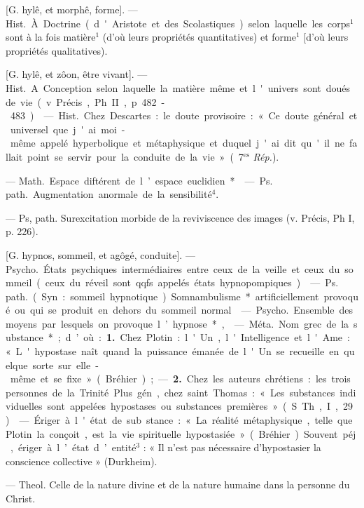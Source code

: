 \begin{itemize}[leftmargin=1cm, label=, itemsep=1pt]
 [G. hylê, et morphê,
forme]. — \si{Hist.} À. Doctrine (d'Aristote et des Scolastiques) selon laquelle les corps$^1$ sont à la fois matière$^1$ (d’où leurs propriétés quantitatives) et forme$^1$ [d’où leurs propriétés qualitatives).

 [G. hylê, et zôon, être
vivant]. — \si{Hist.} A. Conception
selon laquelle la matière même et
l'univers sont doués de vie (v. Précis,
Ph. II, p. 482-483).

 — \si{Hist.} Chez
Descartes : le doute provisoire : « Ce
doute général et universel que j'ai
moi-même appelé hyperbolique et
métaphysique et duquel j'ai dit
qu'il ne fallait point se servir pour...
la conduite de la vie » (7$^\text{es}$ {\it Rép.}).

 — \si{Math.} Espace diftérent de l’espace euclidien*.

 — \si{Ps. path.} Augmentation anormale de la sensibilité$^4$.

 — Ps, path. Surexcitation morbide de la reviviscence
des images (v. Précis, Ph I,
p. 226).

 [G. hypnos,
sommeil, et agôgé, conduite]. —
\si{Psycho.} États psychiques intermédiaires entre ceux de la veille et
ceux du sommeil (ceux du réveil
sont qqfs. appelés états hypnopompiques).

 — \si{Ps. path.} (Syn. : sommeil
hypnotique). Somnambulisme* artificiellement provoqué ou qui se produit en dehors du sommeil normal.

 — \si{Psycho.} Ensemble
des moyens par lesquels on provoque l’hypnose*,

 — \si{Méta.} Nom grec de la
substance*; d’où : {\bf 1.} Chez Plotin :
l'Un, l'Intelligence et l'Ame : « L'hypostase naît quand la puissance
émanée de l'Un se recueille en
quelque sorte sur elle-même et se
fixe » (Bréhier); — {\bf 2.} Chez les auteurs chrétiens : les trois personnes
de la Trinité. Plus gén., chez saint
Thomas : « Les substances individuelles sont appelées hypostases
ou substances premières » (S. Th.,
I, 29).

 — Ériger à l'état de sub
stance : « La réalité métaphysique,
telle que Plotin la conçoit, est la
vie spirituelle hypostasiée » (Bréhier).
Souvent péj., ériger à l’état d’entité$^3$ :
« Il n’est pas nécessaire d’hypostasier la conscience collective » (Durkheim).

 — Theol. Celle
de la nature divine et de la nature
humaine dans la personne du Christ.


\end{itemize}

